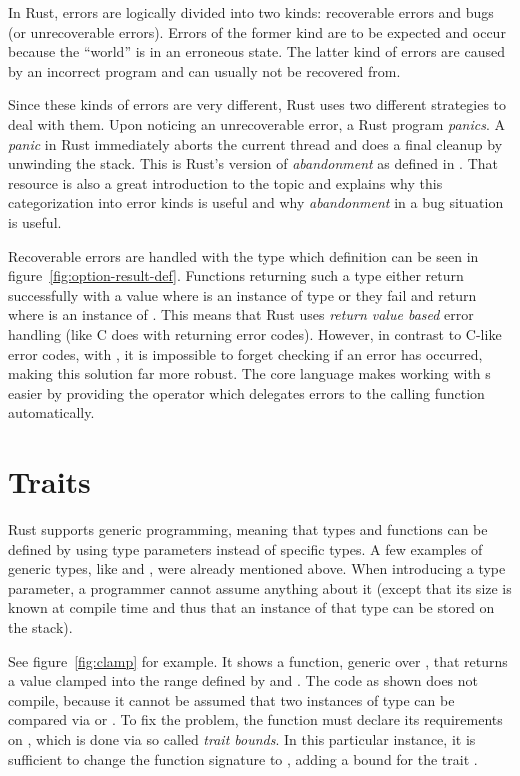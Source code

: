 In Rust, errors are logically divided into two kinds: recoverable errors and bugs (or unrecoverable errors).
Errors of the former kind are to be expected and occur because the \enquote{world} is in an erroneous state.
The latter kind of errors are caused by an incorrect program and can usually not be recovered from.

Since these kinds of errors are very different, Rust uses two different strategies to deal with them.
Upon noticing an unrecoverable error, a Rust program \emph{panics}.
A \emph{panic} in Rust immediately aborts the current thread and does a final cleanup by unwinding the stack.
This is Rust's version of \emph{abandonment} as defined in \cite{duffy2016error}.
That resource is also a great introduction to the topic and explains why this categorization into error kinds is useful and why \emph{abandonment} in a bug situation is useful.

Recoverable errors are handled with the  type which definition can be seen in figure~\ref{fig:option-result-def}.
Functions returning such a type either return successfully with a value  where  is an instance of type  or they fail and return  where  is an instance of .
This means that Rust uses \emph{return value based} error handling (like C does with returning error codes).
However, in contrast to C-like error codes, with , it is impossible to forget checking if an error has occurred, making this solution far more robust.
The core language makes working with s easier by providing the  operator which delegates errors to the calling function automatically.


\section{Traits}

Rust supports generic programming, meaning that types and functions can be defined by using type parameters instead of specific types.
A few examples of generic types, like  and , were already mentioned above.
When introducing a type parameter, a programmer cannot assume anything about it (except that its size is known at compile time and thus that an instance of that type can be stored on the stack).

See figure~\ref{fig:clamp} for example.
It shows a function, generic over , that returns a value clamped into the range defined by  and .
The code as shown does not compile, because it cannot be assumed that two instances of type  can be compared via \code{<} or \code{>}.
To fix the problem, the function must declare its requirements on , which is done via so called \emph{trait bounds}.
In this particular instance, it is sufficient to change the function signature to , adding a bound for the trait .

